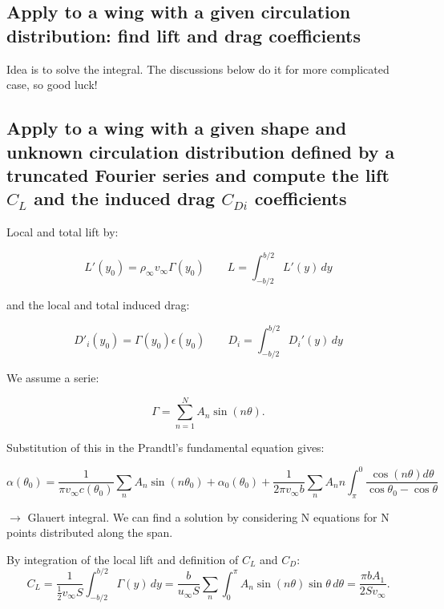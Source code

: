\documentclass[british,french,11pt, a4paper, openany]{article}
\begin{document}
\subsection{Apply to a wing with a given circulation distribution: find lift and drag coefficients}

Idea is to solve the integral. The discussions below do it for more complicated case, so good luck!

\subsection{Apply to a wing with a given shape and unknown circulation distribution defined by a truncated Fourier series and compute the lift $C_L$ and the induced drag $C_{Di}$ coefficients}

Local and total lift by:

\begin{equation}
L'(y_0) = \rho _\infty v_\infty \Gamma (y_0) \qquad L = \int _{-b/2}^{b/2} L'(y)\, dy
\end{equation}

and the local and total induced drag: 

\begin{equation}
D'_i (y_0) = \Gamma (y_0) \epsilon (y_0) \qquad D_i = \int _{-b/2}^{b/2} D_i'(y)\, dy
\end{equation}

We assume a serie:

\begin{equation}
\Gamma = \sum _{n=1} ^N A_n \sin (n\theta).
\end{equation}

Substitution of this in the Prandtl's fundamental equation gives:

\begin{equation}
\alpha (\theta _0) = \frac{1}{\pi v_\infty c(\theta _0)} \sum _n A_n \sin (n\theta_0) + \alpha_0(\theta _0) + \frac{1}{2\pi v_\infty b} \sum _n A_n n \int ^0_\pi \frac{\cos (n\theta)d\theta}{\cos \theta _0 - \cos \theta}
\label{eq:3.32}
\end{equation}

$\rightarrow$ Glauert integral. We can find a solution by considering N equations for N points distributed along the span.

By integration of the local lift and definition of $C_L$ and $C_D$:
\begin{equation}
C_L = \frac{1}{\frac{1}{2}v_\infty S} \int _{-b/2}^{b/2} \Gamma (y) \, dy = \frac{b}{u_\infty S} \sum _n \int _0 ^\pi A_n \sin (n\theta) \sin \theta \, d\theta = \frac{\pi b A_1}{2Sv_\infty}. 
\end{equation}
\end{document}
